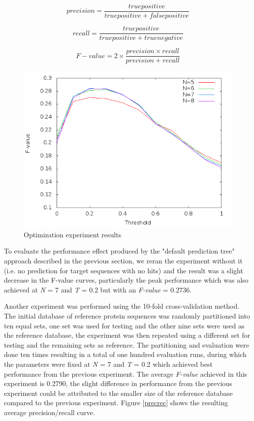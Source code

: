 \documentclass{bioinfo}
\begin{document}
\begin{equation}
precision = \frac{true positive}{true positive + false positive}
\label{eq:02}
\end{equation}

\begin{equation}
recall = \frac{true positive}{true positive + true negative}
\label{eq:03}
\end{equation}

\begin{equation}
F-value = 2\times\frac{precision \times recall}{precision + recall}
\label{eq:04}
\end{equation}

\begin{figure}[!tpb]
\centerline{\includegraphics[scale=0.4]{bilder/optim.png}}
\caption{Optimization experiment results}
\label{optim}
\end{figure}

To evaluate the performance effect produced by the "default prediction tree" approach described in the previous section, we reran the experiment without it (i.e. no prediction for target sequences with no hits) and the result was a slight decrease in the F-value curves, particularly the peak performance which was also achieved at \textit{N} = 7 and \textit{T} = 0.2 but with an \textit{F-value} = 0.2736.

Another experiment was performed using the 10-fold cross-validation method. The initial database of reference protein sequences was randomly partitioned into ten equal sets, one set was used for testing and the other nine sets were used as the reference database, the experiment was then repeated using a different set for testing and the remaining sets as reference. The partitioning and evaluation were done ten times resulting in a total of one hundred evaluation runs, during which the parameters were fixed at \textit{N} = 7 and \textit{T} = 0.2 which achieved best performance from the previous experiment. The average \textit{F-value} achieved in this experiment is 0.2790, the slight difference in performance from the previous experiment could be attributed to the smaller size of the reference database compared to the previous experiment. Figure \ref{precrec} shows the resulting average precision/recall curve.
\end{document}
